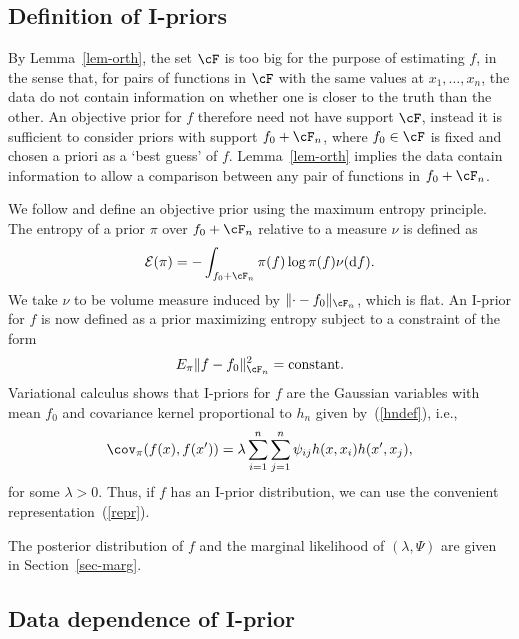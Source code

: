 \documentclass[preprint,12pt,authoryear]{elsarticle}
\DeclarePairedDelimiter{\norm}{\lVert}{\rVert}
\newcommand*\diff{\mathop{}\!\mathrm{d}}
\begin{document}
\subsection{Definition of I-priors}\label{sec-iprior}

By Lemma~\ref{lem-orth}, the set $\cF$ is too big for the purpose of estimating $f$, in the sense that, for pairs of functions in $\cF$ with the same values at $x_1,\ldots,x_n$, the data do not contain information on whether one is closer to the truth than the other.
An objective prior for $f$ therefore need not have support $\cF$, instead it is sufficient to consider priors with support $f_0+\cF_n$, where $f_0\in\cF$ is fixed and chosen a priori as a `best guess' of $f$. Lemma~\ref{lem-orth} implies the data contain information to allow a comparison between any pair of functions in $f_0+\cF_n$. 


We follow \citet{jaynes57a,jaynes57b,jaynes03} and define an objective prior using the maximum entropy principle. 
The entropy of a prior $\pi$ over $f_0+\cF_n$ relative to a measure $\nu$ is defined as
\[  {\cal E}(\pi) = - \int_{f_0+\cF_n}\pi(f)\log\pi(f)\nu(\diff f). \]
We take $\nu$ to be volume measure induced by $\norm{\cdot-f_0}_{\cF_n}$, which is flat. 
An I-prior for $f$ is now defined as a prior maximizing entropy subject to a constraint of the form
\[  E_\pi\norm{f-f_0}_{\cF_n}^2= \mbox{constant}. \]
Variational calculus shows that I-priors for $f$ are the Gaussian variables with mean $f_0$ and covariance kernel proportional to $h_n$ given by~(\ref{hndef}), i.e., 
\[  \cov_{\pi}(f(x),f(x')) = \lambda \sum_{i=1}^n\sum_{j=1}^n \psi_{ij}h(x,x_i)h(x',x_j), \]
for some $\lambda>0$. 
Thus, if $f$ has an I-prior distribution, we can use the convenient representation~(\ref{repr}).



The posterior distribution of $f$ and the marginal likelihood of $(\lambda,\Psi)$ are given in Section~\ref{sec-marg}.



\subsection{Data dependence of I-prior}\label{sec-datadep}
\end{document}
